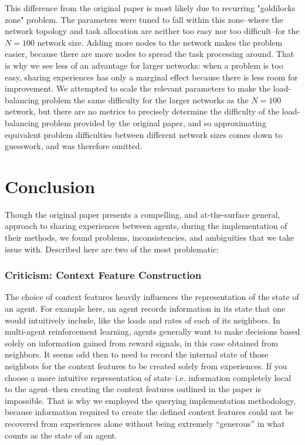 \documentclass[letterpaper]{article}
\begin{document}
This difference from the original paper is most likely due to recurring "goldilocks zone" problem.  The parameters were tuned to fall within this zone--where the network topology and task allocation are neither too easy nor too difficult--for the $N=100$ network size.  Adding more nodes to the network makes the problem easier, because there are more nodes to spread the task processing around.  That is why we see less of an advantage for larger networks: when a problem is too easy, sharing experiences has only a marginal effect because there is less room for improvement.  We attempted to scale the relevant parameters to make the load-balancing problem the same difficulty for the larger networks as the $N=100$ network, but there are no metrics to precisely determine the difficulty of the load-balancing problem provided by the original paper, and so approximating equivalent problem difficulties between different network sizes comes down to guesswork, and was therefore omitted.

\section{Conclusion}
Though the original paper presents a compelling, and at-the-surface general, approach to sharing experiences between agents, during the implementation of their methods, we found problems, inconsistencies, and ambiguities that we take issue with.  Described here are two of the most problematic:
\subsubsection{Criticism: Context Feature Construction}
The choice of context features heavily influences the representation of the state of an agent.  For example here, an agent records information in its state that one would intuitively include, like the loads and rates of each of its neighbors.  In multi-agent reinforcement learning, agents generally want to make decisions based solely on information gained from reward signals, in this case obtained from neighbors.  It seems odd then to need to record the internal state of those neighbors for the context features to be created solely from experiences.  If you choose a more intuitive representation of state--i.e. information completely local to the agent--then creating the context features outlined in the paper is impossible. That is why we employed the querying implementation methodology, because information required to create the defined context features could not be recovered from experiences alone without being extremely “generous” in what counts as the state of an agent.
\end{document}
